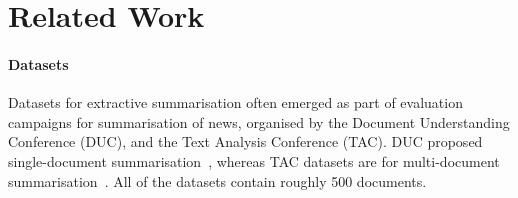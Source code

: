 \documentclass[11pt,a4paper]{article}
\begin{document}

\section{Related Work}

\paragraph{Datasets}
Datasets for extractive summarisation often emerged as part of evaluation campaigns for summarisation of news, organised by the Document Understanding Conference (DUC), and the Text Analysis Conference (TAC).
DUC proposed single-document summarisation~\cite{harman2002duc}, whereas TAC datasets are for multi-document summarisation~\cite{dang2008overview,dang2009overview}. All of the datasets contain roughly 500 documents.

\end{document}
